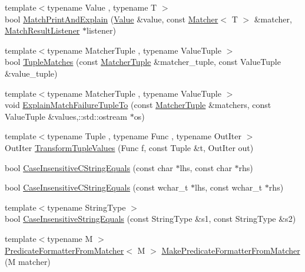 \begin{DoxyCompactItemize}
\item 
{\footnotesize template$<$typename Value , typename T $>$ }\\bool \hyperlink{namespacetesting_1_1internal_a0821df2611d54c79bac990719ad8a2dd}{Match\+Print\+And\+Explain} (\hyperlink{namespacetesting_ae44c50a3a7f0a46f05c8a0b0592b4a62}{Value} \&value, const \hyperlink{classtesting_1_1_matcher}{Matcher}$<$ T $>$ \&matcher, \hyperlink{classtesting_1_1_match_result_listener}{Match\+Result\+Listener} $\ast$listener)
\item 
{\footnotesize template$<$typename Matcher\+Tuple , typename Value\+Tuple $>$ }\\bool \hyperlink{namespacetesting_1_1internal_a10095d1e1c99369200072b39d657ebc4}{Tuple\+Matches} (const \hyperlink{structtesting_1_1internal_1_1_matcher_tuple}{Matcher\+Tuple} \&matcher\+\_\+tuple, const Value\+Tuple \&value\+\_\+tuple)
\item 
{\footnotesize template$<$typename Matcher\+Tuple , typename Value\+Tuple $>$ }\\void \hyperlink{namespacetesting_1_1internal_afc791c20a43da984032e598698ac6ac4}{Explain\+Match\+Failure\+Tuple\+To} (const \hyperlink{structtesting_1_1internal_1_1_matcher_tuple}{Matcher\+Tuple} \&matchers, const Value\+Tuple \&values,\+::std\+::ostream $\ast$os)
\item 
{\footnotesize template$<$typename Tuple , typename Func , typename Out\+Iter $>$ }\\Out\+Iter \hyperlink{namespacetesting_1_1internal_a07ba091a64aa2ba95e41accc55dc8855}{Transform\+Tuple\+Values} (Func f, const Tuple \&t, Out\+Iter out)
\item 
bool \hyperlink{namespacetesting_1_1internal_aebfd0cd34de52d7973a5b2d03ba848cf}{Case\+Insensitive\+C\+String\+Equals} (const char $\ast$lhs, const char $\ast$rhs)
\item 
bool \hyperlink{namespacetesting_1_1internal_ad5b31f61a3cc5b4226d3560f5b48f4dd}{Case\+Insensitive\+C\+String\+Equals} (const wchar\+\_\+t $\ast$lhs, const wchar\+\_\+t $\ast$rhs)
\item 
{\footnotesize template$<$typename String\+Type $>$ }\\bool \hyperlink{namespacetesting_1_1internal_a383de24b1cca6648c14b03964c0ed843}{Case\+Insensitive\+String\+Equals} (const String\+Type \&s1, const String\+Type \&s2)
\item 
{\footnotesize template$<$typename M $>$ }\\\hyperlink{classtesting_1_1internal_1_1_predicate_formatter_from_matcher}{Predicate\+Formatter\+From\+Matcher}$<$ M $>$ \hyperlink{namespacetesting_1_1internal_a3fd0f30ec03d577bba3e1aa13241e17d}{Make\+Predicate\+Formatter\+From\+Matcher} (M matcher)

\end{DoxyCompactItemize}
